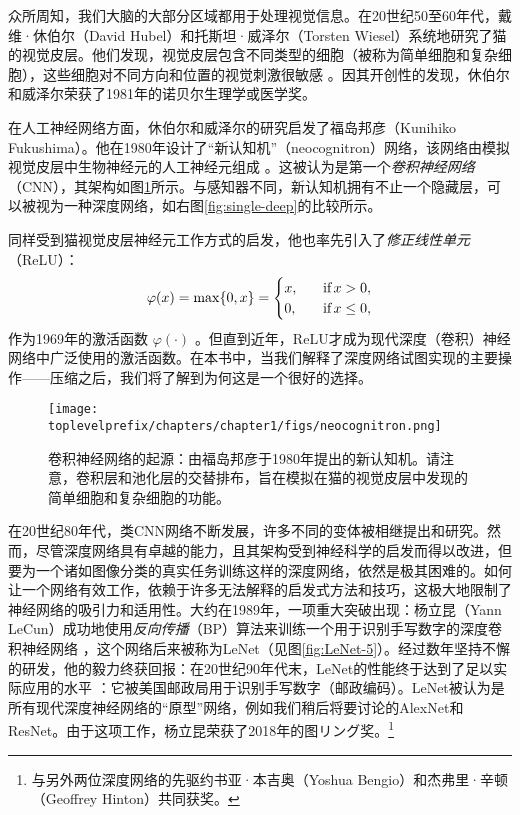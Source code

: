 \documentclass[../../book-main.tex]{subfiles}
\begin{document}
众所周知，我们大脑的大部分区域都用于处理视觉信息。在20世纪50至60年代，戴维·休伯尔（David Hubel）和托斯坦·威泽尔（Torsten Wiesel）系统地研究了猫的视觉皮层。他们发现，视觉皮层包含不同类型的细胞（被称为简单细胞和复杂细胞），这些细胞对不同方向和位置的视觉刺激很敏感 \cite{Hubel-Wiesel-1959}。因其开创性的发现，休伯尔和威泽尔荣获了1981年的诺贝尔生理学或医学奖。


在人工神经网络方面，休伯尔和威泽尔的研究启发了福岛邦彦（Kunihiko Fukushima）。他在1980年设计了“新认知机”（neocognitron）网络，该网络由模拟视觉皮层中生物神经元的人工神经元组成 \cite{Fukushima1980NeocognitronAS}。这被认为是第一个{\em 卷积神经网络}（CNN），其架构如图\ref{fig:neocognitron}所示。与感知器不同，新认知机拥有不止一个隐藏层，可以被视为一种深度网络，如右图\ref{fig:single-deep}的比较所示。

同样受到猫视觉皮层神经元工作方式的启发，他也率先引入了{\em 修正线性单元}（ReLU）：
\begin{equation}
    \varphi(x) = \max\{0, x\} = \begin{cases}x, & \text{if} \, x > 0, \\ 0, \quad & \text{if} \, x \leq 0,\end{cases}
\end{equation}
作为1969年的激活函数 $\varphi(\cdot)$ \cite{Fukushima-1969}。但直到近年，ReLU才成为现代深度（卷积）神经网络中广泛使用的激活函数。在本书中，当我们解释了深度网络试图实现的主要操作——压缩之后，我们将了解到为何这是一个很好的选择。

\begin{figure}
    \centering
    \texttt{[image: \\toplevelprefix/chapters/chapter1/figs/neocognitron.png]}
    \caption{卷积神经网络的起源：由福岛邦彦于1980年提出的新认知机。请注意，卷积层和池化层的交替排布，旨在模拟在猫的视觉皮层中发现的简单细胞和复杂细胞的功能。}
    \label{fig:neocognitron}
\end{figure}

在20世纪80年代，类CNN网络不断发展，许多不同的变体被相继提出和研究。然而，尽管深度网络具有卓越的能力，且其架构受到神经科学的启发而得以改进，但要为一个诸如图像分类的真实任务训练这样的深度网络，依然是极其困难的。如何让一个网络有效工作，依赖于许多无法解释的启发式方法和技巧，这极大地限制了神经网络的吸引力和适用性。大约在1989年，一项重大突破出现：杨立昆（Yann LeCun）成功地使用{\em 反向传播}（BP）算法来训练一个用于识别手写数字的深度卷积神经网络 \cite{LeCun-1989}，这个网络后来被称为LeNet（见图\ref{fig:LeNet-5}）。经过数年坚持不懈的研发，他的毅力终获回报：在20世纪90年代末，LeNet的性能终于达到了足以实际应用的水平 \cite{LeCun-1998}：它被美国邮政局用于识别手写数字（邮政编码）。LeNet被认为是所有现代深度神经网络的“原型”网络，例如我们稍后将要讨论的AlexNet和ResNet。由于这项工作，杨立昆荣获了2018年的图リング奖。\footnote{与另外两位深度网络的先驱约书亚·本吉奥（Yoshua Bengio）和杰弗里·辛顿（Geoffrey Hinton）共同获奖。}
\end{document}
